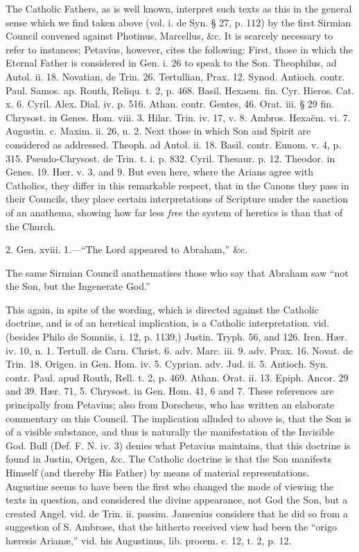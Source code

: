 The Catholic Fathers, as is well known, interpret
such texts as this in the general sense which we find taken above
(vol. i. de Syn. § 27, p. 112) by the first Sirmian Council convened
against Photinus, Marcellus, \&c. It is scarcely necessary to refer
to instances; Petavius, however, cites the following: First, those in
which the Eternal Father is considered in Gen. i. 26 to speak to the
Son. Theophilus, ad Autol. ii. 18. Novatian, de Trin. 26. Tertullian,
Prax. 12. Synod. Antioch. contr. Paul. Samos. ap. Routh, Reliqu. t. 2,
p. 468. Basil. Hexaem. fin. Cyr. Hieros. Cat. x. 6. Cyril. Alex. Dial.
iv. p. 516. Athan. contr. Gentes, 46. Orat. iii. § 29 fin. Chrysost.
in Genes. Hom. viii. 3. Hilar. Trin. iv. 17, v. 8. Ambros. Hexaëm.
vi. 7. Augustin. c. Maxim. ii. 26, n. 2. Next those in which Son and
Spirit are considered as addressed. Theoph. ad Autol. ii. 18. Basil.
contr. Eunom. v. 4, p. 315. Pseudo-Chrysost. de Trin. t. i. p. 832.
Cyril. Thesaur. p. 12. Theodor. in Genes. 19. Hær. v. 3, and 9. But
even here, where the Arians agree with Catholics, they differ in this
remarkable respect, that in the Canons they pass in their Councils,
they place certain interpretations of Scripture under the sanction of
an anathema, showing how far less \emph{free} the system of
heretics is than that of the Church.

2. Gen. xviii. 1.—``The Lord appeared to
Abraham,'' \&c.

The same Sirmian Council anathematises those who
say that Abraham saw ``not the Son, but the Ingenerate God.''

This again, in spite of the wording, which is
directed against the Catholic doctrine, and is of an heretical
implication, is a Catholic interpretation. vid. (besides Philo de
Somniis, i. 12, p. 1139,) Justin. Tryph. 56, and 126. Iren. Hær. iv.
10, n. 1. Tertull. de Carn. Christ. 6. adv. Marc. iii. 9. adv. Prax.
16. Novat. de Trin. 18. Origen. in Gen. Hom. iv. 5. Cyprian. adv. Jud.
ii. 5. Antioch. Syn. contr. Paul. apud Routh, Rell. t. 2, p. 469.
Athan. Orat. ii. 13. Epiph. Ancor. 29 and 39. Hær. 71, 5. Chrysost.
in Gen. Hom. 41, 6 and 7. These references are principally from
Petavius; also from Dorscheus, who has written an elaborate commentary
on this Council. The implication alluded to above is, that the Son is
of a visible substance, and thus is naturally the manifestation of the
Invisible God. Bull (Def. F. N. iv. 3) denies what Petavius maintains,
that this doctrine is found in Justin, Origen, \&c. The Catholic
doctrine is that the Son manifests Himself (and thereby His Father) by
means of material representations. Augustine seems to have been the
first who changed the mode of viewing the texts in question, and
considered the divine appearance, not God the Son, but a created
Angel. vid. de Trin. ii. passim. Jansenius considers that he did
so from a suggestion of S. Ambrose, that the hitherto received view
had been the ``origo hæresis Arianæ,'' vid. his Augustinus, lib. proœm.
c. 12, t. 2, p. 12.

